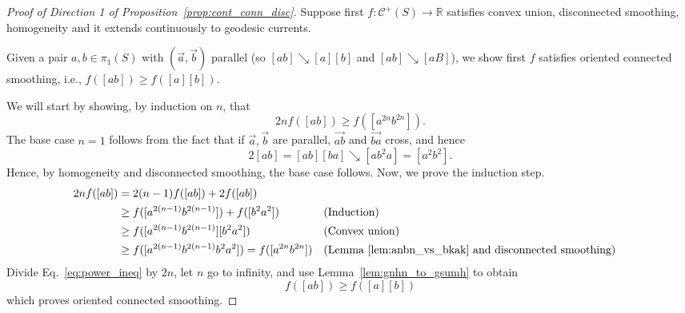 \documentclass[11pt]{amsart}
\newcommand{\ora}[1]{\overrightarrow{#1}}
\numberwithin{equation}{section}
\numberwithin{figure}{section}
\theoremstyle{definition}
\theoremstyle{plain}
\newcommand{\Curves}{\mathcal{C}}
\newcommand{\reducesto}{\mathrel{\searrow}}
\begin{document}
\begin{proof}[Proof of Direction 1 of Proposition~\ref{prop:cont_conn_disc}]
		
Suppose first $f \colon \Curves^+(S) \to \mathbb{R}$ satisfies convex union, disconnected smoothing, homogeneity and it extends continuously to geodesic currents.

			Given a pair $a, b \in \pi_1(S)$ with $(\ora{a},\ora{b})$ parallel (so
			$[ab] \reducesto [a][b]$ and $[ab]\reducesto[aB]$), we show first $f$
			satisfies oriented connected
			smoothing, i.e., $f([ab]) \geq f([a][b])$.
			
			We will start by showing, by induction on $n$, that
			\begin{equation}\label{eq:power_ineq}
				2nf([ab]) \geq f([a^{2n}b^{2n}]).
			\end{equation}
			The base case $n=1$ follows from the fact that if $\ora{a},\ora{b}$
			are parallel, $\ora{ab}$ and $\ora{ba}$ cross, and hence
			\[
			2[ab]=[ab][ba] \reducesto [ab^2a]=[a^2b^2].
			\]
			Hence, by homogeneity and disconnected smoothing, the base case follows.
			Now, we prove the induction step.
			\begin{align*}
				2nf([ab]) &= 2(n-1)f([ab]) + 2f([ab])\\
				&\geq f([a^{2(n-1)}b^{2(n-1)}]) + f([b^2a^2])
				&&\text{(Induction)}\\
				&\geq f([a^{2(n-1)}b^{2(n-1)}][b^2a^2])
				&&\text{(Convex union)}\\
				&\geq f([a^{2(n-1)}b^{2(n-1)} b^2a^2]) = f([a^{2n}b^{2n}])
				&&\text{(Lemma~\ref{lem:anbn_vs_bkak} and disconnected smoothing)}
			\end{align*}
			Divide Eq.~\eqref{eq:power_ineq} by $2n$, let $n$ go to infinity, and
			use Lemma~\ref{lem:gnhn_to_gsumh} to obtain
			\[
			f([ab]) \geq f([a] [b])
			\]
			which proves oriented connected smoothing.
			

\end{proof}
\end{document}
